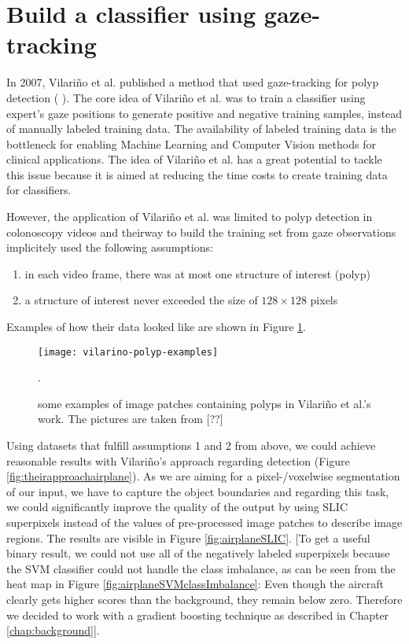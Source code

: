 \section{Build a classifier using gaze-tracking}
In 2007, Vilari\~no et al. published a method that used gaze-tracking for polyp detection ( ). The core idea of Vilari\~no et al. was to train a classifier using expert's gaze positions to generate positive and negative training samples, instead of manually labeled training data. 
The availability of labeled training data is the bottleneck for enabling Machine Learning and Computer Vision methods for clinical applications. 
The idea of Vilari\~no et al. has a great potential to tackle this issue because it is aimed at reducing the time costs to create training data for classifiers. 

However, the application of Vilari\~no et al. was limited to polyp detection in colonoscopy videos and theirway to build the training set from gaze observations implicitely used the following assumptions:
\begin{enumerate}
 \item in each video frame, there was at most one structure of interest (polyp)
 \item a structure of interest never exceeded the size of $128 \times 128$ pixels
\end{enumerate}
Examples of how their data looked like are shown in Figure \ref{fig:vilarinoPolypExamples}.

\begin{figure}[ht]
	\centering
	\texttt{[image: vilarino-polyp-examples]}
	\caption{some examples of image patches containing polyps in Vilari\~no et al.'s work. The pictures are taken from [??]}.
	\label{fig:vilarinoPolypExamples}
\end{figure}

Using datasets that fulfill assumptions 1 and 2 from above, we could achieve reasonable results with Vilari\~no's approach regarding detection (Figure \ref{fig:theirapproachairplane}). As we are aiming for a pixel-/voxelwise segmentation of our input, we have to capture the object boundaries and regarding this task, we could significantly improve the quality of the output by using SLIC superpixels  instead of the values of pre-processed image patches to describe image regions. 
The results are visible in Figure \ref{fig:airplaneSLIC}. [To get a useful binary result, we could not use all of the negatively labeled superpixels because the SVM classifier could not handle the class imbalance, as can be seen from the heat map in Figure \ref{fig:airplaneSVMclassImbalance}: Even though the aircraft clearly gets higher scores than the background, they remain below zero. Therefore we decided to work with a gradient boosting technique as described in Chapter \ref{chap:background}].

